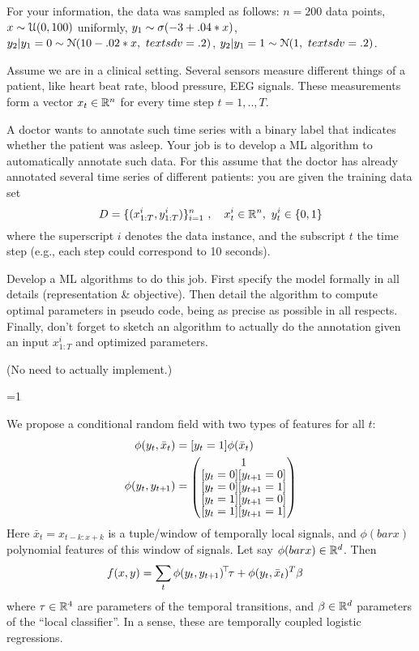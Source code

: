 \begin{solution}
For your information, the data was sampled as follows: $n=200$ data
points, $x \sim {\cal U}(0,100)$ uniformly, $y_1 \sim \sigma(-3+.04*x)$, $y_2 |
y_1=0 \sim {\cal N}(10-.02*x,~ text{sdv}=.2)$, $y_2 | y_1=1 \sim {\cal N}(1,~ text{sdv}=.2)$.
\end{solution}
\fi


\exerfoot



Assume we are in a clinical setting. Several sensors measure
different things of a patient, like heart beat rate, blood pressure,
EEG signals. These measurements form a vector $x_t\in{\mathbb{R}}^n$ for every
time step $t=1,..,T$.

A doctor wants to annotate such time series with a binary label that
indicates whether the patient was asleep. Your job is to develop a ML
algorithm to automatically annotate such data. For this assume that
the doctor has already annotated several time series of different
patients: you are given the training data set
$$ D = \{ (x^i_{1:T}, y^i_{1:T}) \}_{i=1}^n ~,\quad x^i_t\in{\mathbb{R}}^n,~
y^i_t\in\{0,1\} $$
where the superscript $i$ denotes the data instance, and the subscript
$t$ the time step (e.g., each step could correspond to 10 seconds).

Develop a ML algorithms to do this job. First specify the model
formally in all details (representation \& objective). Then detail the
algorithm to compute optimal parameters in pseudo code, being as
precise as possible in all respects. Finally, don't forget to sketch
an algorithm to actually do the annotation given an input $x^i_{1:T}$
and optimized parameters.

(No need to actually implement.)

\ifnum\value{solutions}=1
\begin{solution}
We propose a conditional random field with two types of features for
all $t$:
\begin{align}
\phi(y_t,\bar x_t)
&= [y_t=1] \phi(\bar x_t) \\
\phi(y_t,y_{t\po})
&= \mat{c}{1\\ {[y_t=0]}{[y_{t\po}=0]}\\ {[y_t=0]}{[y_{t\po}=1]}\\ {[y_t=1]}{[y_{t\po}=0]}\\{[y_t=1]}{[y_{t\po}=1]}}
\end{align}
Here $\bar x_t = x_{t-k:x+k}$ is a tuple/window of temporally local
signals, and $\phi(bar x)$ polynomial features of this window of
signals. Let say $\phi(bar x)\in{\mathbb{R}}^d$. Then
\begin{align}
f(x,y)
&= \sum_t \phi(y_t,y_{t{{\hspace*{-.0pt}\text{\rm +}\hspace*{-.5pt}}1}})^{\!\top\!} \tau + \phi(y_t,\bar x_t)^T \beta
\end{align}
where $\tau\in{\mathbb{R}}^4$ are parameters of the temporal transitions, and
$\beta\in{\mathbb{R}}^d$ parameters of the ``local classifier''. In a sense,
these are temporally coupled logistic regressions.
\end{solution}
\fi


\exerfoot
